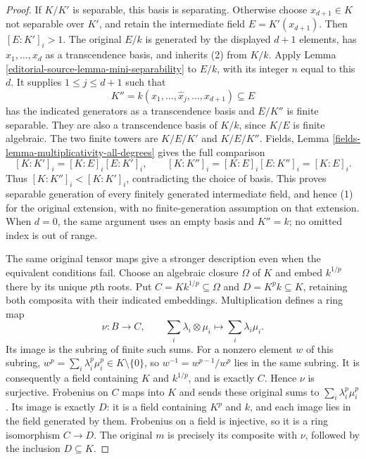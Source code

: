 \begin{proof}
If $K/K'$ is separable, this basis is separating.
Otherwise choose $x_{d+1}\in K$ not separable over
$K'$, and retain the intermediate field
$E=K'(x_{d+1})$. Then $[E:K']_i>1$.
The original $E/k$ is generated by the displayed
$d+1$ elements, has $x_1,\ldots,x_d$ as a
transcendence basis, and inherits (2) from $K/k$.
Apply Lemma \ref{editorial-source-lemma-mini-separability} to $E/k$,
with its integer $n$ equal to this $d$. It supplies
$1\leq j\leq d+1$ such that
$$
K''=k(x_1,\ldots,\widehat x_j,\ldots,x_{d+1})
\subseteq E
$$
has the indicated generators as a transcendence
basis and $E/K''$ is finite separable. They are
also a transcendence basis of $K/k$, since
$K/E$ is finite algebraic. The two finite towers
are $K/E/K'$ and $K/E/K''$. Fields, Lemma
\ref{fields-lemma-multiplicativity-all-degrees}
gives the full comparison
$$
[K:K']_i=[K:E]_i[E:K']_i,
\qquad
[K:K'']_i=[K:E]_i[E:K'']_i=[K:E]_i.
$$
Thus $[K:K'']_i<[K:K']_i$, contradicting the choice
of basis. This proves separable generation of
every finitely generated intermediate field, and
hence (1) for the original extension, with no
finite-generation assumption on that extension.
When $d=0$, the same argument uses an empty basis
and $K''=k$; no omitted index is out of range.

The same original tensor maps give a stronger
description even when the equivalent conditions
fail. Choose an algebraic closure $\Omega$ of $K$
and embed $k^{1/p}$ there by its unique $p$th roots.
Put $C=Kk^{1/p}\subseteq\Omega$ and
$D=K^p k\subseteq K$, retaining both composita
with their indicated embeddings. Multiplication
defines a ring map
$$
\nu:B\longrightarrow C,\qquad
\sum_i\lambda_i\otimes\mu_i\longmapsto
\sum_i\lambda_i\mu_i.
$$
Its image is the subring of finite such sums.
For a nonzero element $w$ of this subring,
$w^p=\sum_i\lambda_i^p\mu_i^p\in K\setminus\{0\}$,
so $w^{-1}=w^{p-1}/w^p$ lies in the same subring.
It is consequently a field containing $K$ and
$k^{1/p}$, and is exactly $C$. Hence $\nu$ is
surjective. Frobenius on $C$ maps into $K$ and
sends these original sums to $\sum_i\lambda_i^p\mu_i^p$.
Its image is exactly $D$: it is a field containing
$K^p$ and $k$, and each image lies in the field
generated by them. Frobenius on a field is injective,
so it is a ring isomorphism $C\longrightarrow D$.
The original $m$ is precisely its composite with
$\nu$, followed by the inclusion $D\subseteq K$.


\end{proof}
